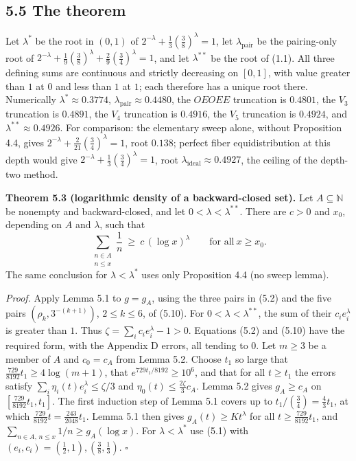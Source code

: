 \documentclass[11pt,a4paper]{article}
\begin{document}
\subsection{5.5 The theorem}\label{the-theorem}

Let \(\lambda^*\) be the root in \((0,1)\) of
\(2^{-\lambda}+\tfrac13(\tfrac38)^{\lambda}=1\), let
\(\lambda_{\mathrm{pair}}\) be the pairing-only root of
\(2^{-\lambda}+\tfrac19(\tfrac38)^{\lambda}+\tfrac29(\tfrac34)^{\lambda}=1\),
and let \(\lambda^{**}\) be the root of (1.1). All three defining sums
are continuous and strictly decreasing on \([0,1]\), with value greater
than \(1\) at \(0\) and less than \(1\) at \(1\); each therefore has a
unique root there. Numerically \(\lambda^*\approx0.3774\),
\(\lambda_{\mathrm{pair}}\approx0.4480\), the \(OEOEE\) truncation is
\(0.4801\), the \(V_3\) truncation is \(0.4891\), the \(V_4\) truncation
is \(0.4916\), the \(V_5\) truncation is \(0.4924\), and
\(\lambda^{**}\approx0.4926\). For comparison: the elementary sweep
alone, without Proposition 4.4, gives
\(2^{-\lambda}+\tfrac2{21}(\tfrac34)^\lambda=1\), root \(0.138\);
perfect fiber equidistribution at this depth would give
\(2^{-\lambda}+\tfrac13(\tfrac34)^\lambda=1\), root
\(\lambda_{\mathrm{ideal}}\approx0.4927\), the ceiling of the depth-two
method.

\textbf{Theorem 5.3 (logarithmic density of a backward-closed set).} Let
\(A\subseteq\mathbb N\) be nonempty and backward-closed, and let
\(0<\lambda<\lambda^{**}\). There are \(c>0\) and \(x_0\), depending on
\(A\) and \(\lambda\), such that \[
\sum_{\substack{n\in A\\ n\le x}}\frac1n\ \ge\ c\,(\log x)^{\lambda}
\qquad\text{for all}\ x\ge x_0 .
\] The same conclusion for \(\lambda<\lambda^*\) uses only Proposition
4.4 (no sweep lemma).

\emph{Proof.} Apply Lemma 5.1 to \(g=g_A\), using the three pairs in
(5.2) and the five pairs \((\rho_k,3^{-(k+1)})\), \(2\le k\le6\), of
(5.10). For \(0<\lambda<\lambda^{**}\), the sum of their
\(c_ie_i^\lambda\) is greater than \(1\). Thus
\(\zeta=\sum_i c_i e_i^\lambda-1>0\). Equations (5.2) and (5.10) have
the required form, with the Appendix D errors, all tending to \(0\). Let
\(m\ge 3\) be a member of \(A\) and \(c_0=c_A\) from Lemma 5.2. Choose
\(t_1\) so large that \(\tfrac{729}{8192}t_1\ge 4\log(m+1)\), that
\(e^{729t_1/8192}\ge 10^6\), and that for all \(t\ge t_1\) the errors
satisfy \(\sum_i\eta_i(t)e_i^\lambda\le\zeta/3\) and
\(\eta_0(t)\le\tfrac{2\zeta}3c_A\). Lemma 5.2 gives \(g_A\ge c_A\) on
\([\tfrac{729}{8192}t_1,t_1]\). The first induction step of Lemma 5.1
covers up to \(t_1/(\tfrac34)=\tfrac43 t_1\), at which
\(\tfrac{729}{8192}t=\tfrac{243}{2048}t_1\). Lemma 5.1 then gives
\(g_A(t)\ge Kt^\lambda\) for all \(t\ge\tfrac{729}{8192}t_1\), and
\(\sum_{n\in A,\,n\le x}1/n\ge g_A(\log x)\). For \(\lambda<\lambda^*\)
use (5.1) with \((e_i,c_i)=(\tfrac12,1),(\tfrac38,\tfrac13)\).
\(\square\)
\end{document}
